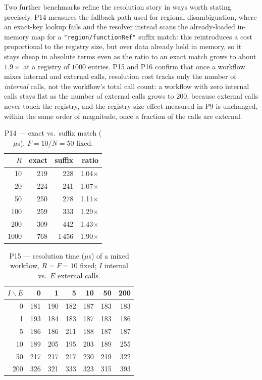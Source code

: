 Two further benchmarks refine the resolution story in ways worth stating precisely. P14 measures
the fallback path used for regional disambiguation, where an exact-key lookup fails and the
resolver instead scans the already-loaded in-memory map for a \texttt{"region/functionRef"}
suffix match: this reintroduces a cost proportional to the registry size, but over data already
held in memory, so it stays cheap in absolute terms even as the ratio to an exact match grows to
about $1.9\times$ at a registry of $1000$ entries. P15 and P16 confirm that once a workflow mixes
internal and external calls, resolution cost tracks only the number of \emph{internal} calls, not
the workflow's total call count: a workflow with zero internal calls stays flat as the number of
external calls grows to $200$, because external calls never touch the registry, and the
registry-size effect measured in P9 is unchanged, within the same order of magnitude, once a
fraction of the calls are external.

\begin{table}[htbp]
  \centering
  \caption{P14 --- exact vs.\ suffix match (\(\mu\)s), $F{=}10$/$N{=}50$ fixed.}
  \label{tab:eval-p14}
  \begin{tabular}{rrrr}
    \hline
    \textbf{$R$} & \textbf{exact} & \textbf{suffix} & \textbf{ratio} \\
    \hline
    10   & 219 & 228    & 1.04$\times$ \\
    20   & 224 & 241    & 1.07$\times$ \\
    50   & 250 & 278    & 1.11$\times$ \\
    100  & 259 & 333    & 1.29$\times$ \\
    200  & 309 & 442    & 1.43$\times$ \\
    1000 & 768 & 1\,456 & 1.90$\times$ \\
    \hline
  \end{tabular}
\end{table}

\begin{table}[htbp]
  \centering
  \caption{P15 --- resolution time (\(\mu\)s) of a mixed workflow, $R{=}F{=}10$ fixed; $I$
  internal vs.\ $E$ external calls.}
  \label{tab:eval-p15}
  \begin{tabular}{rrrrrrr}
    \hline
    $I\backslash E$ & 0 & 1 & 5 & 10 & 50 & 200 \\
    \hline
    0   & 181 & 190 & 182 & 187 & 183 & 183 \\
    1   & 193 & 184 & 183 & 187 & 183 & 186 \\
    5   & 186 & 186 & 211 & 188 & 187 & 187 \\
    10  & 189 & 205 & 195 & 203 & 189 & 255 \\
    50  & 217 & 217 & 217 & 230 & 219 & 322 \\
    200 & 326 & 321 & 333 & 323 & 315 & 393 \\
    \hline
  \end{tabular}
\end{table}

